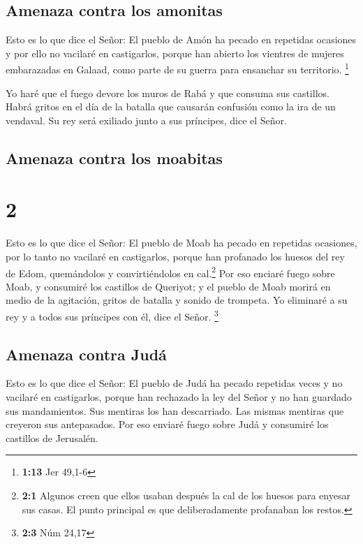 \hypertarget{amenaza-contra-los-amonitas}{%
\subsection{Amenaza contra los
amonitas}\label{amenaza-contra-los-amonitas}}

 Esto es lo que dice el Señor: El pueblo de Amón ha
pecado en repetidas ocasiones y por ello no vacilaré en castigarlos,
porque han abierto los vientres de mujeres embarazadas en Galaad, como
parte de su guerra para ensanchar su territorio. \footnote{\textbf{1:13}
  Jer 49,1-6}

 Yo haré que el fuego devore los muros de Rabá y que
consuma sus castillos. Habrá gritos en el día de la batalla que causarán
confusión como la ira de un vendaval.  Su rey será
exiliado junto a sus príncipes, dice el Señor.

\hypertarget{amenaza-contra-los-moabitas}{%
\subsection{Amenaza contra los
moabitas}\label{amenaza-contra-los-moabitas}}

\hypertarget{section-1}{%
\section{2}\label{section-1}}

 Esto es lo que dice el Señor: El pueblo de Moab ha pecado
en repetidas ocasiones, por lo tanto no vacilaré en castigarlos, porque
han profanado los huesos del rey de Edom, quemándolos y convirtiéndolos
en cal.\footnote{\textbf{2:1} Algunos creen que ellos usaban después la
  cal de los huesos para enyesar sus casas. El punto principal es que
  deliberadamente profanaban los restos.}  Por eso enciaré
fuego sobre Moab, y consumiré los castillos de Queriyot; y el pueblo de
Moab morirá en medio de la agitación, gritos de batalla y sonido de
trompeta.  Yo eliminaré a su rey y a todos sus príncipes
con él, dice el Señor. \footnote{\textbf{2:3} Núm 24,17}

\hypertarget{amenaza-contra-juduxe1}{%
\subsection{Amenaza contra Judá}\label{amenaza-contra-juduxe1}}

 Esto es lo que dice el Señor: El pueblo de Judá ha pecado
repetidas veces y no vacilaré en castigarlos, porque han rechazado la
ley del Señor y no han guardado sus mandamientos. Sus mentiras los han
descarriado. Las mismas mentiras que creyeron sus antepasados.
 Por eso enviaré fuego sobre Judá y consumiré los
castillos de Jerusalén.

